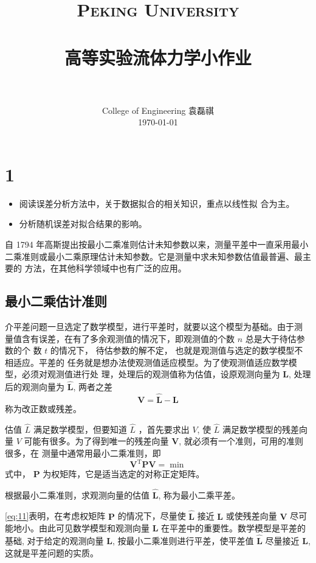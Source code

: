 \documentclass[12pt]{article}
\title{
		\vspace{-1in} 	
		\usefont{OT1}{bch}{b}{n}
		\normalfont \normalsize \textsc{\LARGE Peking University}\\[0.2cm] %
		\horrule{0.5pt} \\[0.2cm]
		\huge \bfseries{高等实验流体力学小作业} \\[-0.2cm]
		\horrule{2pt} \\[0.2cm]
}
\author{
		\normalfont 								\normalsize
		College of Engineering \quad 2001111690  \quad 袁磊祺\\	\normalsize
        \today
}
\date{}
\begin{document}


\maketitle

\section{1}

\begin{itemize}
	\item 阅读误差分析方法中，关于数据拟合的相关知识，重点以线性拟 合为主。
	\item 分析随机误差对拟合结果的影响。
\end{itemize}

自 1794 年高斯提出按最小二乘准则估计未知参数以来，测量平差中一直采用最小二乘准则或最小二乘原理估计未知参数。它是测量中求未知参数估值最普遍、最主要的 方法，在其他科学领域中也有广泛的应用。

\subsection{最小二乘估计准则}

介平差问题一旦选定了数学模型，进行平差时，就要以这个模型为基础。由于测 量值含有误差，在有了多余观测值的情况下，即观测值的个数 $n$ 总是大于待估参数的个 数 $t$ 的情况下， 待估参数的解不定， 也就是观测值与选定的数学模型不相适应。平差的 任务就是想办法使观测值适应模型。为了使观测值适应数学模型，必须对观测值进行处
理，处理后的观测值称为估值，设原观测向量为 $\bm{L}$, 处理后的观测向量为 $\hat{\bm{L}}$, 两者之差
\begin{equation}
	\bm{V}=\hat{\bm{L}}-\bm{L}
\end{equation}
称为改正数或残差。

估值 $\hat{L}$ 满足数学模型，但要知道 $\hat{L}$ ，首先要求出 $V$, 使 $\hat{L}$ 满足数学模型的残差向量
$V$ 可能有很多。为了得到唯一的残差向量 $\bm{V}$, 就必须有一个准则，可用的准则很多，在
测量中通常用最小二乘准则，即
\begin{equation}
	\bm{V}^{\mathrm{T}} \bm{P} \bm{V}=\min
	\label{eq:11}
\end{equation}
式中， $\bm{P}$ 为权矩阵，它是适当选定的对称正定矩阵。

根据最小二乘准则，求观测向量的估值 $\hat{\bm{L}}$, 称为最小二乘平差。

\cref{eq:11}表明，在考虑权矩阵 $\bm{P}$ 的情况下，尽量使 $\hat{\bm{L}}$ 接近 $\bm{L}$ 或使残差向量 $\bm{V}$ 尽可 能地小。由此可见数学模型和观测向量 $\bm{L}$ 在平差中的重要性。数学模型是平差的基础, 对于给定的观测向量 $\bm{L}$, 按最小二乘准则进行平差，使平差值 $\hat{\bm{L}}$ 尽量接近 $\bm{L}$, 这就是平差问题的实质。
\end{document}
